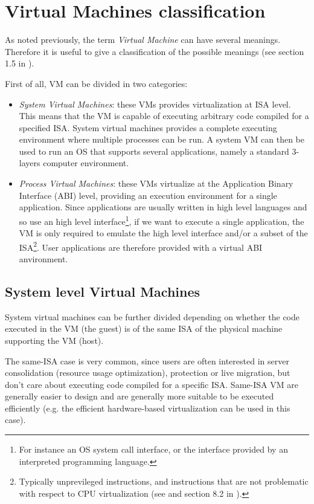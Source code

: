 \section{Virtual Machines classification}
\label{sec:vmclass}

As noted previously, the term \emph{Virtual Machine} can have several meanings. Therefore it is useful to give
a classification of the possible meanings (see \cite{ref:vmclassification} section 1.5 in \cite{ref:vmbook}).

First of all, VM can be divided in two categories:
\begin{itemize}
    \item \emph{System Virtual Machines}: these VMs provides virtualization at ISA level. This means that the VM is capable of executing 
	  arbitrary code compiled for a specified ISA.  System virtual machines provides a complete executing environment where
	  multiple processes can be run.
	  A system VM can then be used to run an OS that supports several applications, namely a standard 3-layers computer
	  environment.
	  
    \item \emph{Process Virtual Machines}: these VMs virtualize at the Application Binary Interface (ABI) level, providing
	  an execution environment for a single application. Since
	  applications are usually written in high level languages and so use an high level interface\footnote{For instance an OS 
	  system call interface, or the interface provided by an interpreted programming language.}, if we want to execute a single
	  application, the VM is only required to emulate the high level interface and/or a subset of the ISA\footnote{Typically 
	  unprevileged instructions, and instructions that are not problematic with respect to CPU virtualization (see \cite{ref:x86-virt}
	  and section 8.2 in \cite{ref:vmbook}).}. User applications are therefore provided with a virtual ABI anvironment.
\end{itemize}

\subsection{System level Virtual Machines}
System virtual machines can be further divided depending on whether the code executed in the VM (the guest) is of the same ISA
of the physical machine supporting the VM (host).

The same-ISA case is very common, since users are often interested in server consolidation (resource usage optimization), protection or
live migration, but don't care about executing code compiled for a specific ISA. Same-ISA VM are generally easier to design and 
are generally more suitable to be executed efficiently (e.g. the efficient hardware-based virtualization can be used in this case).

